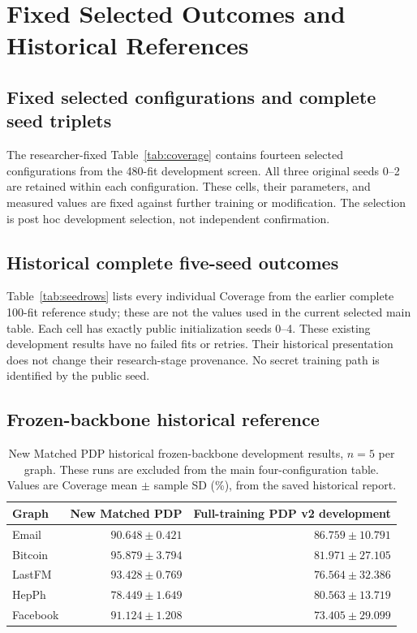 \chapter{Fixed Selected Outcomes and Historical References}\label{app:development}
\section{Fixed selected configurations and complete seed triplets}
The researcher-fixed Table~\ref{tab:coverage} contains fourteen selected configurations from the 480-fit development screen. All three original seeds 0--2 are retained within each configuration. These cells, their parameters, and measured values are fixed against further training or modification. The selection is post hoc development selection, not independent confirmation.



\clearpage
\section{Historical complete five-seed outcomes}
Table~\ref{tab:seedrows} lists every individual Coverage from the earlier complete 100-fit reference study; these are not the values used in the current selected main table. Each cell has exactly public initialization seeds 0--4. These existing development results have no failed fits or retries. Their historical presentation does not change their research-stage provenance. No secret training path is identified by the public seed.


\clearpage
\section{Frozen-backbone historical reference}
\begin{table}[htbp]
\centering\small
\caption{New Matched PDP historical frozen-backbone development results, $n=5$ per graph. These runs are excluded from the main four-configuration table. Values are Coverage mean $\pm$ sample SD (\%), from the saved historical report.}\label{tab:newmatched}
\begin{tabular}{lrr}\toprule
Graph & New Matched PDP & Full-training PDP v2 development\\\midrule
Email & $90.648\pm0.421$ & $86.759\pm10.791$\\
Bitcoin & $95.879\pm3.794$ & $81.971\pm27.105$\\
LastFM & $93.428\pm0.769$ & $76.564\pm32.386$\\
HepPh & $78.449\pm1.649$ & $80.563\pm13.719$\\
Facebook & $91.124\pm1.208$ & $73.405\pm29.099$\\\bottomrule
\end{tabular}
\end{table}

